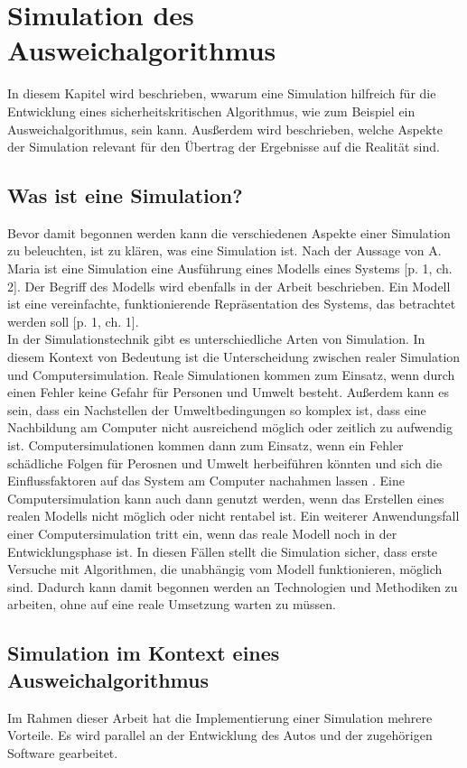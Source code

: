 \section{Simulation des Ausweichalgorithmus}

In diesem Kapitel wird beschrieben, wwarum eine Simulation hilfreich für die Entwicklung eines 
sicherheitskritischen Algorithmus, wie zum Beispiel ein Ausweichalgorithmus, sein kann.
Ausßerdem wird beschrieben, welche Aspekte der Simulation relevant für den Übertrag der Ergebnisse auf die Realität sind.

\subsection{Was ist eine Simulation?}
\label{Simulation}
Bevor damit begonnen werden kann die verschiedenen Aspekte einer Simulation zu beleuchten, ist zu klären, was eine Simulation ist.
Nach der Aussage von A. Maria ist eine Simulation eine Ausführung eines Modells eines Systems \cite{maria1997introduction}[p. 1, ch. 2].
Der Begriff des Modells wird ebenfalls in der Arbeit beschrieben. 
Ein Modell ist eine vereinfachte, funktionierende Repräsentation des Systems, das betrachtet werden soll \cite{maria1997introduction}[p. 1, ch. 1].\\
In der Simulationstechnik gibt es unterschiedliche Arten von Simulation. 
In diesem Kontext von Bedeutung ist die Unterscheidung zwischen realer Simulation und Computersimulation. 
Reale Simulationen kommen zum Einsatz, wenn durch einen Fehler keine Gefahr für Personen und Umwelt besteht.
Außerdem kann es sein, dass ein Nachstellen der Umweltbedingungen so komplex ist, dass eine Nachbildung am Computer nicht ausreichend möglich oder zeitlich zu aufwendig ist. 
Computersimulationen kommen dann zum Einsatz, wenn ein Fehler schädliche Folgen für Perosnen und Umwelt herbeiführen könnten und sich die Einflussfaktoren auf das System am Computer nachahmen lassen \cite{Britannica2023}. 
Eine Computersimulation kann auch dann genutzt werden, wenn das Erstellen eines realen Modells nicht möglich oder nicht rentabel ist. 
Ein weiterer Anwendungsfall einer Computersimulation tritt ein, wenn das reale Modell noch in der Entwicklungsphase ist. 
In diesen Fällen stellt die Simulation sicher, dass erste Versuche mit Algorithmen, die unabhängig vom Modell funktionieren, möglich sind. 
Dadurch kann damit begonnen werden an Technologien und Methodiken zu arbeiten, ohne auf eine reale Umsetzung warten zu müssen.

\subsection{Simulation im Kontext eines Ausweichalgorithmus}
Im Rahmen dieser Arbeit hat die Implementierung einer Simulation mehrere Vorteile. 
Es wird parallel an der Entwicklung des Autos und der zugehörigen Software gearbeitet.

